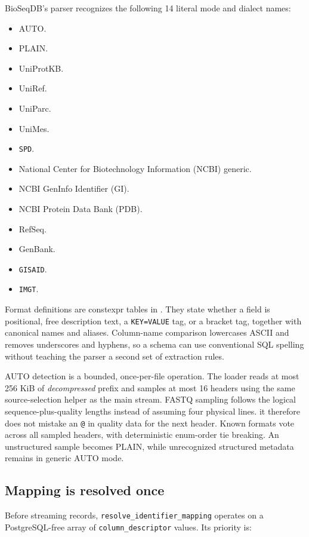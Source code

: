 BioSeqDB's parser recognizes the following 14 literal mode and dialect names:
\begin{itemize}
  \item AUTO.
  \item PLAIN.
  \item UniProtKB.
  \item UniRef.
  \item UniParc.
  \item UniMes.
  \item \texttt{SPD}.
  \item National Center for Biotechnology Information (NCBI) generic.
  \item NCBI GenInfo Identifier (GI).
  \item NCBI Protein Data Bank (PDB).
  \item RefSeq.
  \item GenBank.
  \item \texttt{GISAID}.
  \item \texttt{IMGT}.
\end{itemize}
Format definitions are constexpr tables in
.  They state
whether a field is positional, free description text, a
\texttt{KEY=VALUE} tag, or a bracket tag, together with canonical names and
aliases.  Column-name comparison lowercases ASCII and removes underscores and
hyphens, so a schema can use conventional SQL spelling without teaching the
parser a second set of extraction rules.

AUTO detection is a bounded, once-per-file operation.  The loader reads at most
256 KiB of \emph{decompressed} prefix and samples at most 16 headers using the
same source-selection helper as the main stream.  FASTQ sampling follows the
logical sequence-plus-quality lengths instead of assuming four physical lines.
it therefore does not mistake an \texttt{@} in quality data for the next
header.  Known formats vote across all sampled headers, with deterministic
enum-order tie breaking.  An unstructured sample becomes PLAIN, while
unrecognized structured metadata remains in generic AUTO mode.

\subsection{Mapping is resolved once}

Before streaming records, \texttt{resolve\_identifier\_mapping} operates on a
PostgreSQL-free array of \texttt{column\_descriptor} values.  Its priority is:

